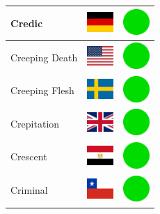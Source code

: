 \documentclass[12pt, a4paper, twoside]{report}
\begin{document}
\begin{center}
\begin{longtable}{|p{5cm}|p{2cm}|p{2cm}|}
 Credic                                                     & \includegraphics[width=1cm]{../4x3/de} &   \includegraphics[width=1cm]{../likes/y} \\ \hline
 Creeping Death                                             & \includegraphics[width=1cm]{../4x3/us} &   \includegraphics[width=1cm]{../likes/y} \\ \hline
 Creeping Flesh                                             & \includegraphics[width=1cm]{../4x3/se} &   \includegraphics[width=1cm]{../likes/y} \\ \hline
 Crepitation                                                & \includegraphics[width=1cm]{../4x3/gb} &   \includegraphics[width=1cm]{../likes/y} \\ \hline
 Crescent                                                   & \includegraphics[width=1cm]{../4x3/eg} &   \includegraphics[width=1cm]{../likes/y} \\ \hline
 Criminal                                                   & \includegraphics[width=1cm]{../4x3/cl} &   \includegraphics[width=1cm]{../likes/y} \\ \hline

\end{longtable}
\end{center}
\end{document}
